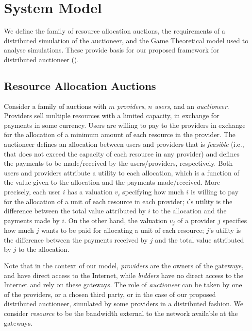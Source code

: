 
\section{System Model}
\label{sec__dist_auctioneer_model}
We define the family of resource allocation auctions, the requirements of 
a distributed simulation of the auctioneer, and the Game Theoretical model
used to analyse simulations.
These provide basis for our proposed framework for distributed auctioneer 
	().
	
\subsection{Resource Allocation Auctions}
Consider a family of auctions with $m$ \emph{providers},
$n$ \emph{users}, and an \emph{auctioneer}.
Providers sell multiple resources with a limited capacity,
in exchange for payments in some currency. Users are willing to pay
to the providers in exchange for the allocation of a minimum amount 
of each resource in the provider.
The auctioneer defines an allocation between users and providers
that is \emph{feasible} (i.e., that does not exceed 
the capacity of each resource in any provider)
and defines the payments to be made/received by the users/providers, respectively.
Both users and providers attribute a utility to each allocation,
which is a function of the value given to the allocation and the payments made/received.
More precisely, each user $i$ has a valuation $v_i$ 
specifying how much $i$ is willing to pay for the allocation
of a unit of each resource in each provider;
$i$'s utility is the difference between the total value
attributed by $i$ to the allocation and the payments made by $i$.
On the other hand, the valuation $v_j$ of a provider $j$
specifies how much $j$ wants to be paid for allocating a unit of each resource;
$j$'s utility is the difference between the payments received by $j$
and the total value attributed by $j$ to the allocation.

Note that in the context of our model, 
\emph{providers} are the owners of the gateways, and have direct access to the Internet,
while \emph{bidders} have no direct access to the Internet and rely on these gateways.
The role of \emph{auctioneer} can be taken by one of the providers, or a chosen third party,
or in the case of our proposed distributed auctioneer, 
simulated by some providers in a distributed fashion.
We consider \emph{resource} to be the bandwidth external to the network available at the gateways.

